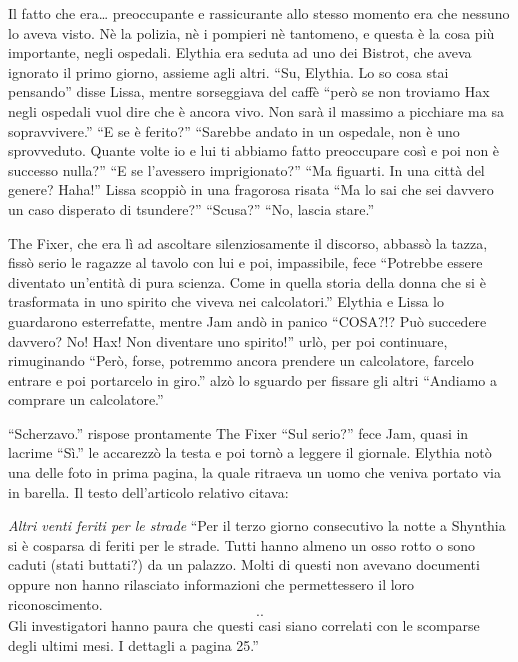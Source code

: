    Il fatto che era\dots{} preoccupante e rassicurante allo stesso
    momento era che nessuno lo aveva visto. Nè la polizia, nè i pompieri
    nè tantomeno, e questa è la cosa più importante, negli ospedali.
    Elythia era seduta ad uno dei Bistrot, che aveva ignorato il primo
    giorno, assieme agli altri. ``Su, Elythia. Lo so cosa stai pensando''
    disse Lissa, mentre sorseggiava del caffè ``però se non troviamo Hax
    negli ospedali vuol dire che è ancora vivo. Non sarà il massimo a
    picchiare ma sa sopravvivere.'' ``E se è ferito?'' ``Sarebbe andato in
    un ospedale, non è uno sprovveduto. Quante volte io e lui ti abbiamo
    fatto preoccupare così e poi non è successo nulla?'' ``E se l'avessero
    imprigionato?'' ``Ma figuarti. In una città del genere? Haha!'' Lissa
    scoppiò in una fragorosa risata ``Ma lo sai che sei davvero un caso
    disperato di tsundere?'' ``Scusa?'' ``No, lascia stare.''

    The Fixer, che era lì ad ascoltare silenziosamente il discorso, abbassò
    la tazza, fissò serio le ragazze al tavolo con lui e poi, impassibile,
    fece ``Potrebbe essere diventato un'entità di pura scienza. Come in
    quella storia della donna che si è trasformata in uno spirito che
    viveva nei calcolatori.'' Elythia e Lissa lo guardarono esterrefatte,
    mentre Jam andò in panico ``COSA?!? Può succedere davvero? No! Hax! Non
    diventare uno spirito!'' urlò, per poi continuare, rimuginando ``Però,
    forse, potremmo ancora prendere un calcolatore, farcelo entrare e poi
    portarcelo in giro.'' alzò lo sguardo per fissare gli altri ``Andiamo a
    comprare un calcolatore.''

    ``Scherzavo.'' rispose prontamente The Fixer ``Sul serio?'' fece Jam,
    quasi in lacrime ``Sì.'' le accarezzò la testa e poi tornò a leggere il
    giornale. Elythia notò una delle foto in prima pagina, la quale
    ritraeva un uomo che veniva portato via in barella. Il testo
    dell'articolo relativo citava:

    \emph{Altri venti feriti per le strade}
    ``Per il terzo giorno consecutivo la notte a Shynthia si è cosparsa di
    feriti per le strade. Tutti hanno almeno un osso rotto o sono caduti
    (stati buttati?) da un palazzo. Molti di questi non avevano documenti
    oppure non hanno rilasciato informazioni che permettessero il loro
    riconoscimento. \[..\] Gli investigatori hanno paura che questi casi
    siano correlati con le scomparse degli ultimi mesi. I dettagli a pagina
    25.''

